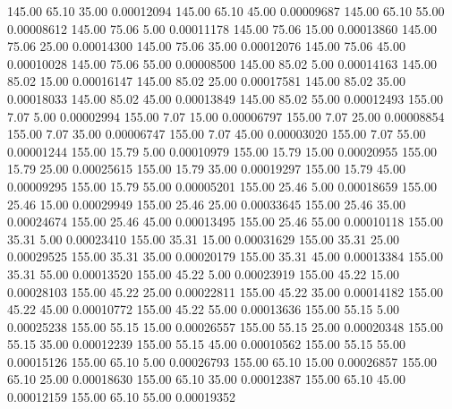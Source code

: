     145.00     65.10     35.00     0.00012094
    145.00     65.10     45.00     0.00009687
    145.00     65.10     55.00     0.00008612
    145.00     75.06      5.00     0.00011178
    145.00     75.06     15.00     0.00013860
    145.00     75.06     25.00     0.00014300
    145.00     75.06     35.00     0.00012076
    145.00     75.06     45.00     0.00010028
    145.00     75.06     55.00     0.00008500
    145.00     85.02      5.00     0.00014163
    145.00     85.02     15.00     0.00016147
    145.00     85.02     25.00     0.00017581
    145.00     85.02     35.00     0.00018033
    145.00     85.02     45.00     0.00013849
    145.00     85.02     55.00     0.00012493
    155.00      7.07      5.00     0.00002994
    155.00      7.07     15.00     0.00006797
    155.00      7.07     25.00     0.00008854
    155.00      7.07     35.00     0.00006747
    155.00      7.07     45.00     0.00003020
    155.00      7.07     55.00     0.00001244
    155.00     15.79      5.00     0.00010979
    155.00     15.79     15.00     0.00020955
    155.00     15.79     25.00     0.00025615
    155.00     15.79     35.00     0.00019297
    155.00     15.79     45.00     0.00009295
    155.00     15.79     55.00     0.00005201
    155.00     25.46      5.00     0.00018659
    155.00     25.46     15.00     0.00029949
    155.00     25.46     25.00     0.00033645
    155.00     25.46     35.00     0.00024674
    155.00     25.46     45.00     0.00013495
    155.00     25.46     55.00     0.00010118
    155.00     35.31      5.00     0.00023410
    155.00     35.31     15.00     0.00031629
    155.00     35.31     25.00     0.00029525
    155.00     35.31     35.00     0.00020179
    155.00     35.31     45.00     0.00013384
    155.00     35.31     55.00     0.00013520
    155.00     45.22      5.00     0.00023919
    155.00     45.22     15.00     0.00028103
    155.00     45.22     25.00     0.00022811
    155.00     45.22     35.00     0.00014182
    155.00     45.22     45.00     0.00010772
    155.00     45.22     55.00     0.00013636
    155.00     55.15      5.00     0.00025238
    155.00     55.15     15.00     0.00026557
    155.00     55.15     25.00     0.00020348
    155.00     55.15     35.00     0.00012239
    155.00     55.15     45.00     0.00010562
    155.00     55.15     55.00     0.00015126
    155.00     65.10      5.00     0.00026793
    155.00     65.10     15.00     0.00026857
    155.00     65.10     25.00     0.00018630
    155.00     65.10     35.00     0.00012387
    155.00     65.10     45.00     0.00012159
    155.00     65.10     55.00     0.00019352
